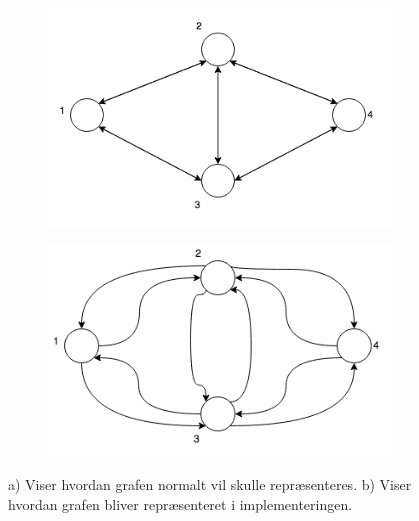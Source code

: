 \documentclass[a4paper,10pt,titlepage]{article}
\begin{document}
\begin{figure}[H]
\centering
\begin{subfigure}{.5\textwidth}
  \centering
  \includegraphics[width=1\linewidth]{Billeder/GraphBidirectionalNoPropSimple.png}
  \caption{}
\end{subfigure}%
\begin{subfigure}{.5\textwidth}
  \centering
  \includegraphics[width=1\linewidth]{Billeder/GraphBidirectionalNoProp.png}
  \caption{}
\end{subfigure}
\caption{a) Viser hvordan grafen normalt vil skulle repræsenteres. b) Viser hvordan grafen bliver repræsenteret i implementeringen.}
\end{figure}
\end{document}
